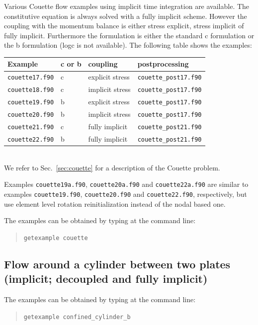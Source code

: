 Various Couette flow examples using implicit time integration are available. The constitutive equation is always solved with a fully implicit scheme. However the coupling with the momentum balance is either stress explicit, stress implicit of fully implicit. Furthermore the formulation is either the standard c formulation or the b formulation (logc is not available). The following table shows the examples:\medskip\\
\begin{tabular}{llll}
Example & c or b  & coupling & postprocessing \\\hline
 \texttt{couette17.f90} & c & explicit stress & \texttt{couette\_post17.f90} \\
 \texttt{couette18.f90} & c & implicit stress & \texttt{couette\_post17.f90} \\
 \texttt{couette19.f90} & b & explicit stress & \texttt{couette\_post17.f90} \\
 \texttt{couette20.f90} & b & implicit stress & \texttt{couette\_post17.f90} \\
 \texttt{couette21.f90} & c & fully implicit & \texttt{couette\_post21.f90} \\
 \texttt{couette22.f90} & b & fully implicit & \texttt{couette\_post21.f90} 
\end{tabular}\medskip\\
We refer to Sec.~\ref{sec:couette} for a description of the Couette problem.

Examples \texttt{couette19a.f90}, \texttt{couette20a.f90} and \texttt{couette22a.f90} are similar to examples \texttt{couette19.f90}, \texttt{couette20.f90} and \texttt{couette22.f90}, respectively, but use element level rotation reinitialization instead of the nodal based one.

The examples can be obtained by typing at the
command line:
\medskip
\begin{quote}
   \texttt{getexample couette}
\end{quote}

\subsection{Flow around a cylinder between two plates (implicit; decoupled and fully implicit)}
\label{sec:cylinderimplicit}
The examples can be obtained by typing at the command line:
\begin{quote}
   \texttt{getexample confined\_cylinder\_b}
\end{quote}

